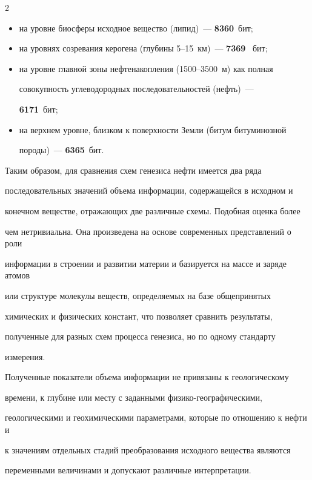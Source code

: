 \begin{multicols}{2}
     \begin{itemize}

\item на уровне биосферы исходное вещество (липид)~--- \textbf{8360}~бит; 

\item на уровнях созревания керогена (глубины 5--15~км)~--- \textbf{7369}~ бит; 

\item на уровне главной зоны нефтенакопления (1500--3500~м) как полная 

совокупность углеводородных последовательностей (нефть)~--- 

\textbf{6171}~бит; 

\item на верхнем уровне, близком к поверхности Земли (битум битуминозной 

породы)~--- \textbf{6365}~бит. 

     \end{itemize}

     

     Таким образом, для сравнения схем генезиса нефти имеется два ряда 

последовательных значений объема информации, содержащейся в исходном и 

конечном веществе, отражающих две различные схемы. Подобная оценка более 

чем нетривиальна. Она произведена на основе современных пред\-став\-ле\-ний о роли 

информации в строении и развитии материи и базируется на массе и заряде атомов 

или структуре молекулы веществ, определяемых на базе общепринятых 

химических и физических констант, что позволяет сравнить результаты, 

полученные для разных схем процесса генезиса, но по одному стандарту 

измерения. 

     

     Полученные показатели объема информации не привязаны к геологическому 

времени, к глубине или месту с заданными физико-географическими, 

геологическими и геохимическими параметрами, которые по отношению к нефти и 

к значениям отдельных стадий преобразования исходного вещества являются 

переменными величинами и допускают различные интерпретации. 


\end{multicols}
